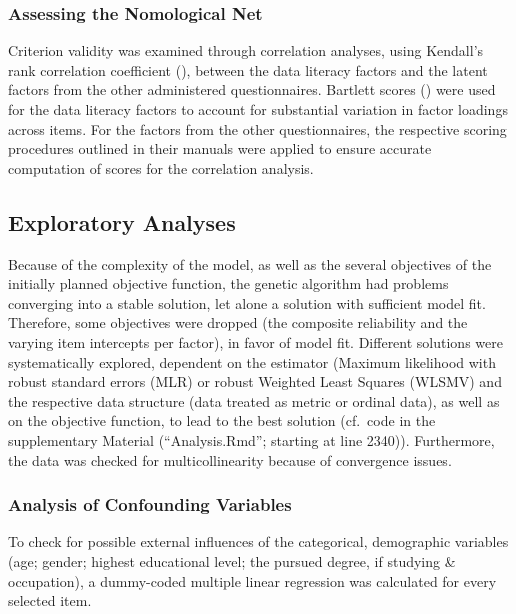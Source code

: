\documentclass[
  12pt,
  a4paper,
  twoside]{article}
\begin{document}
\subsubsection{Assessing the Nomological Net}\label{assessing-the-nomological-net}

Criterion validity was examined through correlation analyses, using Kendall's rank correlation coefficient (), between the data literacy factors and the latent factors from the other administered questionnaires. Bartlett scores () were used for the data literacy factors to account for substantial variation in factor loadings across items. For the factors from the other questionnaires, the respective scoring procedures outlined in their manuals were applied to ensure accurate computation of scores for the correlation analysis.

\subsection{Exploratory Analyses}\label{exploratory-analyses}

Because of the complexity of the model, as well as the several objectives of the initially planned objective function, the genetic algorithm had problems converging into a stable solution, let alone a solution with sufficient model fit. Therefore, some objectives were dropped (the composite reliability and the varying item intercepts per factor), in favor of model fit. Different solutions were systematically explored, dependent on the estimator (Maximum likelihood with robust standard errors (MLR) or robust Weighted Least Squares (WLSMV) and the respective data structure (data treated as metric or ordinal data), as well as on the objective function, to lead to the best solution (cf.~code in the supplementary Material (``Analysis.Rmd''; starting at line 2340)). Furthermore, the data was checked for multicollinearity because of convergence issues.

\subsubsection{Analysis of Confounding Variables}\label{analysis-of-confounding-variables}

To check for possible external influences of the categorical, demographic variables (age; gender; highest educational level; the pursued degree, if studying \& occupation), a dummy-coded multiple linear regression was calculated for every selected item.
\end{document}
